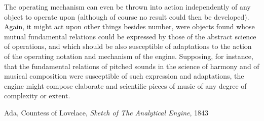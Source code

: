 \begin{schemeregion}
\begin{smallquote}
{The operating mechanism can even be thrown into action independently of any object to operate upon (although of course no result could then be developed). Again, it might act upon other things besides number, were objects found whose mutual fundamental relations could be expressed by those of the abstract science of operations, and which should be also susceptible of adaptations to the action of the operating notation and mechanism of the engine. Supposing, for instance, that the fundamental relations of pitched sounds in the science of harmony and of musical composition were susceptible of such expression and adaptations, the engine might compose elaborate and scientific pieces of music of any degree of complexity or extent. }

\raggedleft Ada, Countess of Lovelace, \emph{Sketch of The Analytical Engine},  1843 %
\end{smallquote} 
\end{schemeregion}


